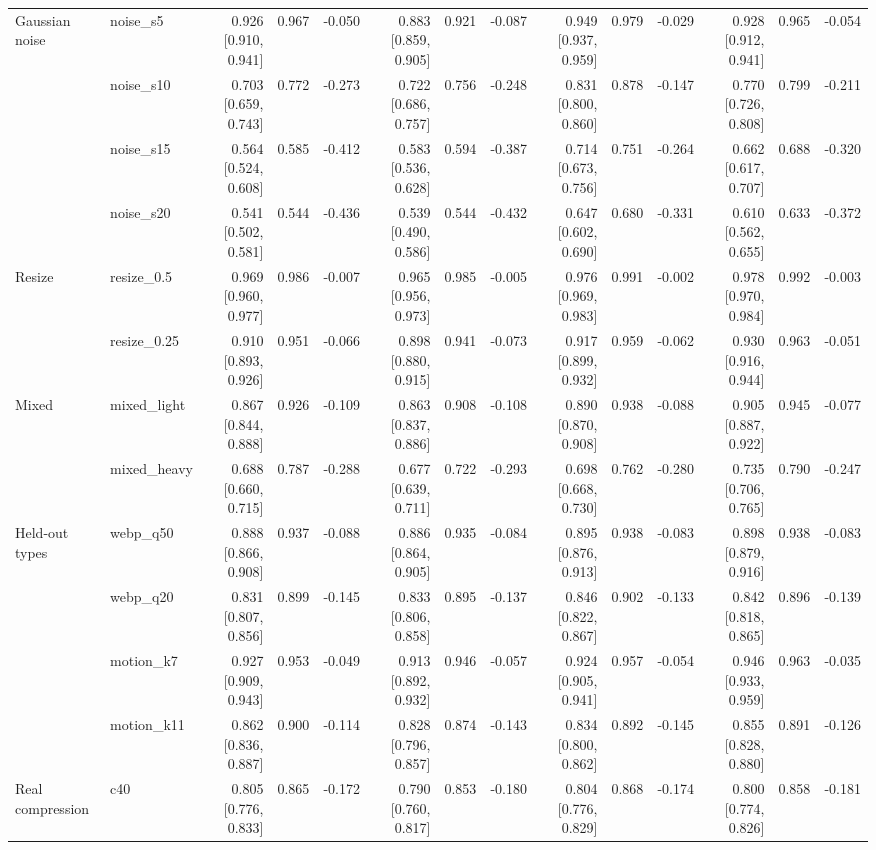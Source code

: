 \begin{tabular}{llrrrrrrrrrrrr}
Gaussian noise & noise\_s5 & 0.926 [0.910, 0.941] & 0.967 & -0.050 & 0.883 [0.859, 0.905] & 0.921 & -0.087 & 0.949 [0.937, 0.959] & 0.979 & -0.029 & 0.928 [0.912, 0.941] & 0.965 & -0.054 \\
 & noise\_s10 & 0.703 [0.659, 0.743] & 0.772 & -0.273 & 0.722 [0.686, 0.757] & 0.756 & -0.248 & 0.831 [0.800, 0.860] & 0.878 & -0.147 & 0.770 [0.726, 0.808] & 0.799 & -0.211 \\
 & noise\_s15 & 0.564 [0.524, 0.608] & 0.585 & -0.412 & 0.583 [0.536, 0.628] & 0.594 & -0.387 & 0.714 [0.673, 0.756] & 0.751 & -0.264 & 0.662 [0.617, 0.707] & 0.688 & -0.320 \\
 & noise\_s20 & 0.541 [0.502, 0.581] & 0.544 & -0.436 & 0.539 [0.490, 0.586] & 0.544 & -0.432 & 0.647 [0.602, 0.690] & 0.680 & -0.331 & 0.610 [0.562, 0.655] & 0.633 & -0.372 \\
Resize & resize\_0.5 & 0.969 [0.960, 0.977] & 0.986 & -0.007 & 0.965 [0.956, 0.973] & 0.985 & -0.005 & 0.976 [0.969, 0.983] & 0.991 & -0.002 & 0.978 [0.970, 0.984] & 0.992 & -0.003 \\
 & resize\_0.25 & 0.910 [0.893, 0.926] & 0.951 & -0.066 & 0.898 [0.880, 0.915] & 0.941 & -0.073 & 0.917 [0.899, 0.932] & 0.959 & -0.062 & 0.930 [0.916, 0.944] & 0.963 & -0.051 \\
Mixed & mixed\_light & 0.867 [0.844, 0.888] & 0.926 & -0.109 & 0.863 [0.837, 0.886] & 0.908 & -0.108 & 0.890 [0.870, 0.908] & 0.938 & -0.088 & 0.905 [0.887, 0.922] & 0.945 & -0.077 \\
 & mixed\_heavy & 0.688 [0.660, 0.715] & 0.787 & -0.288 & 0.677 [0.639, 0.711] & 0.722 & -0.293 & 0.698 [0.668, 0.730] & 0.762 & -0.280 & 0.735 [0.706, 0.765] & 0.790 & -0.247 \\
Held-out types & webp\_q50 & 0.888 [0.866, 0.908] & 0.937 & -0.088 & 0.886 [0.864, 0.905] & 0.935 & -0.084 & 0.895 [0.876, 0.913] & 0.938 & -0.083 & 0.898 [0.879, 0.916] & 0.938 & -0.083 \\
 & webp\_q20 & 0.831 [0.807, 0.856] & 0.899 & -0.145 & 0.833 [0.806, 0.858] & 0.895 & -0.137 & 0.846 [0.822, 0.867] & 0.902 & -0.133 & 0.842 [0.818, 0.865] & 0.896 & -0.139 \\
 & motion\_k7 & 0.927 [0.909, 0.943] & 0.953 & -0.049 & 0.913 [0.892, 0.932] & 0.946 & -0.057 & 0.924 [0.905, 0.941] & 0.957 & -0.054 & 0.946 [0.933, 0.959] & 0.963 & -0.035 \\
 & motion\_k11 & 0.862 [0.836, 0.887] & 0.900 & -0.114 & 0.828 [0.796, 0.857] & 0.874 & -0.143 & 0.834 [0.800, 0.862] & 0.892 & -0.145 & 0.855 [0.828, 0.880] & 0.891 & -0.126 \\
Real compression & c40 & 0.805 [0.776, 0.833] & 0.865 & -0.172 & 0.790 [0.760, 0.817] & 0.853 & -0.180 & 0.804 [0.776, 0.829] & 0.868 & -0.174 & 0.800 [0.774, 0.826] & 0.858 & -0.181 \\
\bottomrule
\end{tabular}
